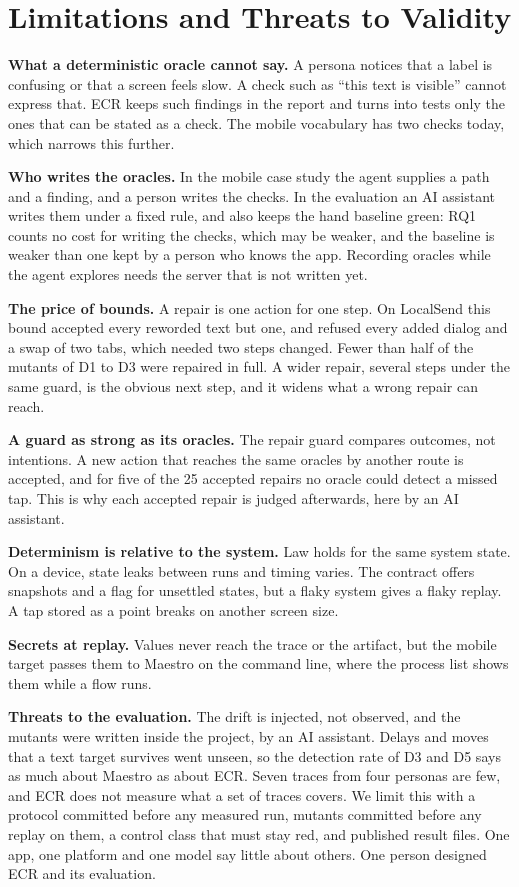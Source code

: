 \section{Limitations and Threats to Validity}
\label{sec:limits}

\textbf{What a deterministic oracle cannot say.} A persona notices that a label is confusing or that a screen feels slow. A check such as ``this text is visible'' cannot express that. ECR keeps such findings in the report and turns into tests only the ones that can be stated as a check. The mobile vocabulary has two checks today, which narrows this further.

\textbf{Who writes the oracles.} In the mobile case study the agent supplies a path and a finding, and a person writes the checks. In the evaluation an AI assistant writes them under a fixed rule, and also keeps the hand baseline green: RQ1 counts no cost for writing the checks, which may be weaker, and the baseline is weaker than one kept by a person who knows the app. Recording oracles while the agent explores needs the server that is not written yet.

\textbf{The price of bounds.} A repair is one action for one step. On LocalSend this bound accepted every reworded text but one, and refused every added dialog and a swap of two tabs, which needed two steps changed. Fewer than half of the mutants of \textsf{D1} to \textsf{D3} were repaired in full. A wider repair, several steps under the same guard, is the obvious next step, and it widens what a wrong repair can reach.

\textbf{A guard as strong as its oracles.} The repair guard compares outcomes, not intentions. A new action that reaches the same oracles by another route is accepted, and for five of the 25 accepted repairs no oracle could detect a missed tap. This is why each accepted repair is judged afterwards, here by an AI assistant.

\textbf{Determinism is relative to the system.} Law  holds for the same system state. On a device, state leaks between runs and timing varies. The contract offers snapshots and a flag for unsettled states, but a flaky system gives a flaky replay. A tap stored as a point breaks on another screen size.

\textbf{Secrets at replay.} Values never reach the trace or the artifact, but the mobile target passes them to Maestro on the command line, where the process list shows them while a flow runs.

\textbf{Threats to the evaluation.} The drift is injected, not observed, and the mutants were written inside the project, by an AI assistant. Delays and moves that a text target survives went unseen, so the detection rate of \textsf{D3} and \textsf{D5} says as much about Maestro as about ECR. Seven traces from four personas are few, and ECR does not measure what a set of traces covers. We limit this with a protocol committed before any measured run, mutants committed before any replay on them, a control class that must stay red, and published result files. One app, one platform and one model say little about others. One person designed ECR and its evaluation.
